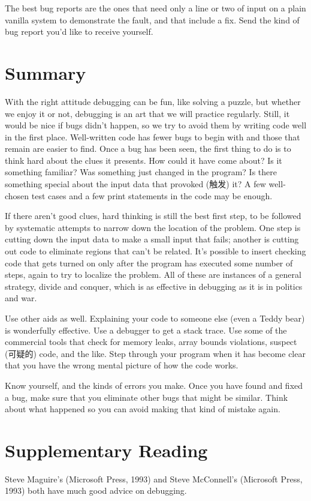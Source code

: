 The best bug reports are the ones that need only a line or two of input on
a plain vanilla system to demonstrate the fault, and that include a fix.
Send the kind of bug report you'd like to receive yourself.

\section{Summary}
With the right attitude debugging can be fun, like solving a puzzle, but
whether we enjoy it or not, debugging is an art that we will practice
regularly.  Still, it would be nice if bugs didn't happen, so we try to
avoid them by writing code well in the first place. Well-written code has
fewer bugs to begin with and those that remain are easier to find.  Once a
bug has been seen, the first thing to do is to think hard about the clues
it presents. How could it have come about? Is it something familiar? Was
something just changed in the program? Is there something special about the
input data that provoked (触发) it? A few well-chosen test cases and a few
print statements in the code may be enough. 

If there aren't good clues, hard thinking is still the best first step, to
be followed by systematic attempts to narrow down the location of the
problem. One step is cutting down the input data to make a small input that
fails; another is cutting out code to eliminate regions that can't be
related. It's possible to insert checking code that gets turned on only
after the program has executed some number of steps, again to try to
localize the problem. All of these are instances of a general strategy,
divide and conquer, which is as effective in debugging as it is in politics
and war. 

Use other aids as well. Explaining your code to someone else (even a Teddy
bear) is wonderfully effective. Use a debugger to get a stack trace. Use
some of the commercial tools that check for memory leaks, array bounds
violations, suspect (可疑的) code, and the like. Step through your program
when it has become clear that you have the wrong mental picture of how the
code works.

Know yourself, and the kinds of errors you make. Once you have found and
fixed a bug, make sure that you eliminate other bugs that might be similar.
Think about what happened so you can avoid making that kind of mistake
again.

\section*{Supplementary Reading}
Steve Maguire's  (Microsoft Press, 1993) and
Steve McConnell's  (Microsoft Press, 1993) both
have much good advice on debugging.
